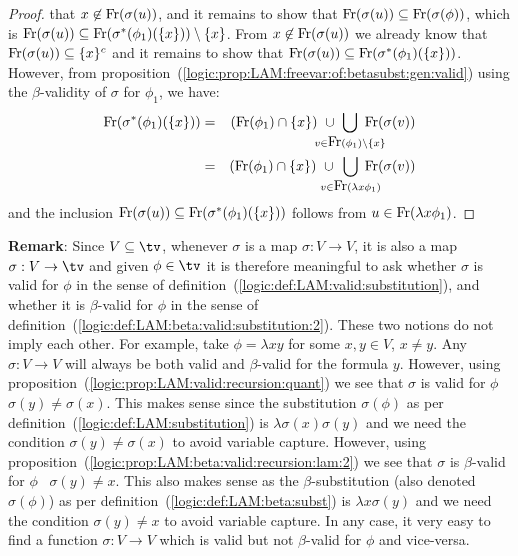 \begin{proof}
    that $x\not\in\mbox{\rm Fr}(\sigma(u))$, and it remains to show that 
    $\mbox{\rm Fr}(\sigma(u))\subseteq\mbox{\rm Fr}(\sigma(\phi))$, which is
    $\mbox{\rm Fr}(\sigma(u))\subseteq\mbox{\rm Fr}(\sigma^{*}(\phi_{1})(\{x\}))\setminus\{x\}$.
    From $x\not\in\mbox{\rm Fr}(\sigma(u))$ we already know that 
    $\mbox{\rm Fr}(\sigma(u))\subseteq\{x\}^{c}$ and it remains to show that
    $\mbox{\rm Fr}(\sigma(u))\subseteq\mbox{\rm Fr}(\sigma^{*}(\phi_{1})(\{x\}))$. However, from 
    proposition~(\ref{logic:prop:LAM:freevar:of:betasubst:gen:valid}) using the 
    $\beta$-validity of $\sigma$ for $\phi_{1}$, we have:
    \begin{eqnarray*}
        \free(\sigma^{*}(\phi_{1})(\{x\}))
        &=&(\free(\phi_{1})\cap\{x\})
        \ \cup\ 
        \!\!\!\!\!\!\!\!\!\!\!\!
        \bigcup_{v\in\free(\phi_{1})\setminus\{x\}} 
        \!\!\!\!\!\!\!\!\!\!
        \free(\sigma(v))\\
        &=&(\free(\phi_{1})\cap\{x\})
        \ \cup\ 
        \!\!\!\!\!\!\!\!\!
        \bigcup_{v\in\free(\lambda x\phi_{1})} 
        \!\!\!\!\!\!\!\!
        \free(\sigma(v))
    \end{eqnarray*}
    and the inclusion 
    $\mbox{\rm Fr}(\sigma(u))\subseteq\mbox{\rm Fr}(\sigma^{*}(\phi_{1})(\{x\}))$
    follows from $u\in\mbox{\rm Fr}(\lambda x\phi_{1})$.
\end{proof}
{\bf Remark}: Since $V\subseteq\tv$, whenever $\sigma$ is a map 
$\sigma:V\to V$, it is also a map $\sigma:V\to\tv$ and given $\phi\in\tv$
it is therefore meaningful to ask whether $\sigma$ is valid for $\phi$ 
in the sense of definition~(\ref{logic:def:LAM:valid:substitution}), 
and whether it is $\beta$-valid for $\phi$ in the sense of 
definition~(\ref{logic:def:LAM:beta:valid:substitution:2}). These two
notions do not imply each other. For example, take $\phi=\lambda x y$
for some $x,y\in V$, $x\neq y$. Any $\sigma:V\to V$ will always be
both valid and $\beta$-valid for the formula $y$. However, using
proposition~(\ref{logic:prop:LAM:valid:recursion:quant}) we see that
$\sigma$ is valid for $\phi$ \ifand\ $\sigma(y)\neq\sigma(x)$. This makes
sense since the substitution $\sigma(\phi)$ as per 
definition~(\ref{logic:def:LAM:substitution}) is $\lambda\sigma(x)\sigma(y)$
and we need the condition $\sigma(y)\neq\sigma(x)$ to avoid variable
capture. However, using 
proposition~(\ref{logic:prop:LAM:beta:valid:recursion:lam:2}) we see that 
$\sigma$ is $\beta$-valid for $\phi$ \ifand\ $\sigma(y)\neq x$.
This also makes sense as the $\beta$-substitution (also denoted $\sigma(\phi)$)
as per definition~(\ref{logic:def:LAM:beta:subst}) is $\lambda x \sigma(y)$
and we need the condition $\sigma(y)\neq x$ to avoid variable capture. In any
case, it very easy to find a function $\sigma:V\to V$ which is valid but not 
$\beta$-valid for $\phi$ and vice-versa.

